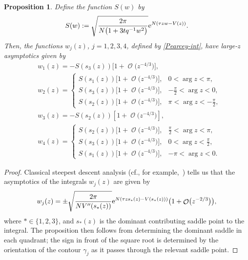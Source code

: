 \documentclass[pdftex]{sigma}
\DeclareMathOperator{\OO}{\mathcal{O}}
\numberwithin{equation}{section}
\newtheorem{Proposition}[Theorem]{Proposition}
 { \theoremstyle{definition}
\newtheorem{Definition}[Theorem]{Definition}
\newtheorem{Note}[Theorem]{Note}
\newtheorem{Example}[Theorem]{Example}
\newtheorem{Remark}[Theorem]{Remark} }
\begin{document}
 \begin{Proposition}
 Define the function $S(w)$ by
 \begin{equation*}
 S(w) := \sqrt{\frac{2\pi}{N\bigl(1+3tq^{-1}w^2\bigr)}}{\rm e}^{N(\tau z w -V(z) )}.
 \end{equation*}
 Then, the functions $w_j(z)$, $j=1,2,3,4$, defined by \eqref{Pearcey-int}, have large-$z$ asymptotics given by
 \begin{align*}
 &w_1(z)= -S(s_3(z))\bigl[1 + \OO\bigl(z^{-4/3}\bigr)\bigr],\\
 &w_2(z)=
 \begin{cases}
 S(s_1(z))\bigl[1 + \OO\bigl(z^{-4/3}\bigr)\bigr], & 0 < \arg z < \pi,\\
 S(s_3(z))\bigl[1 + \OO\bigl(z^{-4/3}\bigr)\bigr], & -\frac{\pi}{2} < \arg z < 0,\\
 S(s_2(z))\bigl[1 + \OO\bigl(z^{-4/3}\bigr)\bigr], & \pi < \arg z < -\frac{\pi}{2},
 \end{cases}\\
 &w_3(z)= -S(s_2(z))[1 + \OO\bigl(z^{-4/3}\bigr)],\\
 &w_4(z)=
 \begin{cases}
 S(s_2(z))\bigl[1 + \OO\bigl(z^{-4/3}\bigr)\bigr], & \frac{\pi}{2} < \arg z < \pi,\\
 S(s_3(z))\bigl[1 + \OO\bigl(z^{-4/3}\bigr)\bigr], & 0 < \arg z < \frac{\pi}{2},\\
 S(s_1(z))\bigl[1 + \OO\bigl(z^{-4/3}\bigr)\bigr], & -\pi < \arg z < 0.
 \end{cases}
 \end{align*}
 \end{Proposition}
 \begin{proof}
 Classical steepest descent analysis (cf., for example,~\cite{Miller}) tells us that the asymptotics of the integrals $w_j(z)$ are given by
 \begin{equation*}
 w_j(z) = \pm \sqrt{\frac{2\pi}{NV''(s_*(z))}}{\rm e}^{N(\tau z s_{*}(z) -V(s_*(z)) )}\bigl(1 + \OO\bigl(z^{-2/3}\bigr)\bigr),
 \end{equation*}
 where $*\in\{1,2,3\}$, and $s_{*}(z)$ is the dominant contributing saddle point to the integral. The proposition then follows from determining the dominant saddle in each quadrant; the sign in front of the square root is determined by the orientation of the contour $\gamma_j$ as it passes through
 the relevant saddle point.
 \end{proof}
\end{document}
